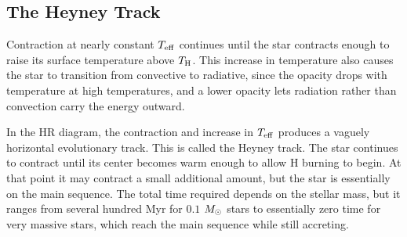 \subsection{The Heyney Track}

Contraction at nearly constant $T_{\rm eff}$ continues until the star contracts enough to raise its surface temperature above $T_{\rm H}$. This increase in temperature also causes the star to transition from convective to radiative, since the opacity drops with temperature at high temperatures, and a lower opacity lets radiation rather than convection carry the energy outward.

In the HR diagram, the contraction and increase in $T_{\rm eff}$ produces a vaguely horizontal evolutionary track. This is called the Heyney track. The star continues to contract until its center becomes warm enough to allow H burning to begin.
At that point it may contract a small additional amount, but the star is essentially on the main sequence. The total time required depends on the stellar mass, but it ranges from several hundred Myr for $0.1$ $M_{\odot}$ stars to essentially zero time for very massive stars, which reach the main sequence while still accreting.


